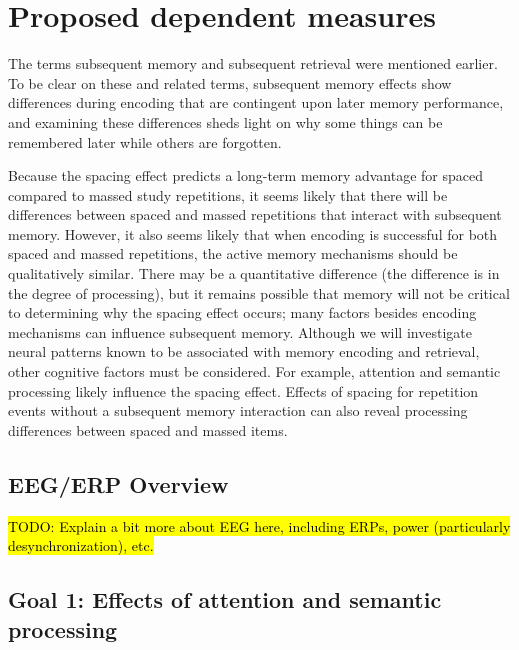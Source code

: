 
\section{Proposed dependent measures}

\cbstart
The terms subsequent memory and subsequent retrieval were mentioned earlier.  To be clear on these and related terms, subsequent memory effects show differences during encoding that are contingent upon later memory performance, and examining these differences sheds light on why some things can be remembered later while others are forgotten.
\cbend

Because the spacing effect predicts a long-term memory advantage for spaced compared to massed study repetitions, it seems likely that there will be differences between spaced and massed repetitions that interact with subsequent memory.  However, it also seems likely that when encoding is successful for both spaced and massed repetitions, the active memory mechanisms should be qualitatively similar.  There may be a quantitative difference (the difference is in the degree of processing), but it remains possible that memory will not be critical to determining why the spacing effect occurs; many factors besides encoding mechanisms can influence subsequent memory.  Although we will investigate neural patterns known to be associated with memory encoding and retrieval, other cognitive factors must be considered.  For example, attention and semantic processing likely influence the spacing effect.  Effects of spacing for repetition events without a subsequent memory interaction can also reveal processing differences between spaced and massed items.


\subsection{EEG/ERP Overview}

\cbstart
\hl{TODO: Explain a bit more about EEG here, including ERPs, power (particularly desynchronization), etc.}
\cbend



\subsection{Goal 1: Effects of attention and semantic processing}


